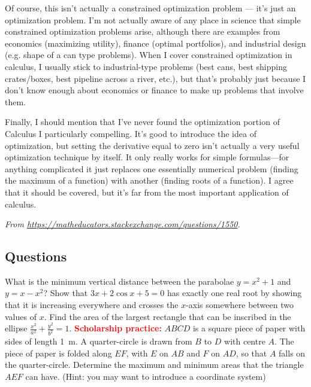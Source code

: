 Of course, this isn't actually a constrained optimization problem --- it's just an optimization problem. I'm not actually aware of any place in science that simple constrained optimization problems arise, although there are examples from economics (maximizing utility), finance (optimal portfolios), and industrial design (e.g. shape of a can type problems). When I cover constrained optimization in calculus, I usually stick to industrial-type problems (best cans, best shipping crates/boxes, best pipeline across a river, etc.), but that's probably just because I don't know enough about economics or finance to make up problems that involve them.

Finally, I should mention that I've never found the optimization portion of Calculus I particularly compelling. It's good to introduce the idea of optimization, but setting the derivative equal to zero isn't actually a very useful optimization technique by itself. It only really works for simple formulas—for anything complicated it just replaces one essentially numerical problem (finding the maximum of a function) with another (finding roots of a function). I agree that it should be covered, but it's far from the most important application of calculus.

\textit{From \url{https://matheducators.stackexchange.com/questions/1550}.}

\subsection*{Questions}
\begin{questions}
  \question What is the minimum vertical distance between the parabolae $ y = x^2 + 1 $ and $ y = x - x^2 $?
  \question Show that $ 3x + 2\cos x + 5 = 0 $ has exactly one real root by showing that it
            is increasing everywhere and crosses the $ x$-axis somewhere between two values of $ x $.
  \question Find the area of the largest rectangle that can be inscribed in the ellipse $ \frac{x^2}{a^2} + \frac{y^2}{b^2} = 1 $.
  \question \textbf{\textcolor{red}{Scholarship practice:}} $ ABCD $ is a square piece of paper with sides of length \SI{1}{\metre}. A
            quarter-circle is drawn from $ B $ to $ D $ with centre $ A $. The piece of paper is folded along $ EF $, with $ E $ on $ AB $
            and $ F $ on $ AD $, so that $ A $ falls on the quarter-circle. Determine the maximum and minimum areas that the triangle $ AEF $
            can have. (Hint: you may want to introduce a coordinate system)
\end{questions}

